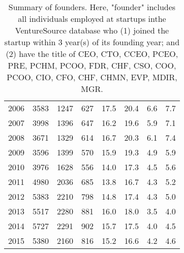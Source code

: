 \begin{table}[!htb]
\begin{tabular}{p{1.75cm}p{1.75cm}p{1.75cm}p{1.75cm}p{1.75cm}p{1.75cm}p{1.75cm}p{1.75cm}}
  2006 & 3583 & 1247 & 627 & 17.5 & 20.4 & 6.6 & 7.7 \\ 
  2007 & 3998 & 1396 & 647 & 16.2 & 19.6 & 5.9 & 7.1 \\ 
  2008 & 3671 & 1329 & 614 & 16.7 & 20.3 & 6.1 & 7.4 \\ 
  2009 & 3596 & 1399 & 570 & 15.9 & 19.3 & 4.9 & 5.9 \\ 
  2010 & 3976 & 1628 & 556 & 14.0 & 17.3 & 4.5 & 5.6 \\ 
  2011 & 4980 & 2036 & 685 & 13.8 & 16.7 & 4.3 & 5.2 \\ 
  2012 & 5383 & 2210 & 798 & 14.8 & 17.4 & 4.3 & 5.0 \\ 
  2013 & 5517 & 2280 & 881 & 16.0 & 18.0 & 3.5 & 4.0 \\ 
  2014 & 5727 & 2291 & 902 & 15.7 & 17.5 & 4.0 & 4.5 \\ 
  2015 & 5380 & 2160 & 816 & 15.2 & 16.6 & 4.2 & 4.6 \\ 
   \bottomrule
\end{tabular}
\endgroup
\caption{Summary of founders. Here, "founder" includes all individuals employed at startups inthe VentureSource database who (1) joined the startup within 3 year(s) of its founding year; and (2) have the title of CEO, CTO, CCEO, PCEO, PRE, PCHM, PCOO, FDR, CHF, CSO, COO, PCOO, CIO, CFO, CHF, CHMN, EVP, MDIR, MGR.} 
\label{table:GStable_executive}
\end{table}
